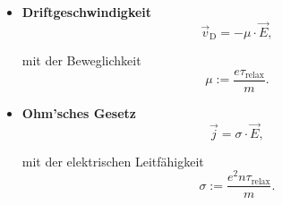 \documentclass{article}
\begin{document}
	\begin{itemize}
		\item \textbf{Driftgeschwindigkeit}\\
			\begin{equation}
				\vec{v}_\text{D} = -\mu \cdot \vec{E},
			\end{equation}
		
		mit der Beweglichkeit
			\begin{equation}
				\mu := \frac{e\tau_\text{relax}}{m}.
			\end{equation}
		
		
		\item \textbf{Ohm'sches Gesetz}\\
			\begin{equation}
				\vec{j} = \sigma \cdot \vec{E},
			\end{equation}
		
		mit der elektrischen Leitfähigkeit
			\begin{equation}
				\sigma := \frac{e^2n\tau_\text{relax}}{m}.
			\end{equation}
	\end{itemize}


\newpage
\end{document}
